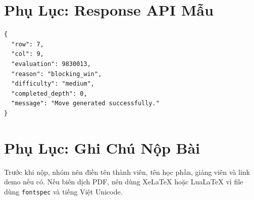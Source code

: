 \documentclass[12pt,a4paper]{article}
\begin{document}
\section{Phụ Lục: Response API Mẫu}

\begin{lstlisting}[language={}]
{
  "row": 7,
  "col": 9,
  "evaluation": 9830013,
  "reason": "blocking_win",
  "difficulty": "medium",
  "completed_depth": 0,
  "message": "Move generated successfully."
}
\end{lstlisting}

\section{Phụ Lục: Ghi Chú Nộp Bài}

Trước khi nộp, nhóm nên điền tên thành viên, tên học phần, giảng viên và link demo nếu có. Nếu biên dịch PDF, nên dùng XeLaTeX hoặc LuaLaTeX vì file dùng \texttt{fontspec} và tiếng Việt Unicode.
\end{document}
